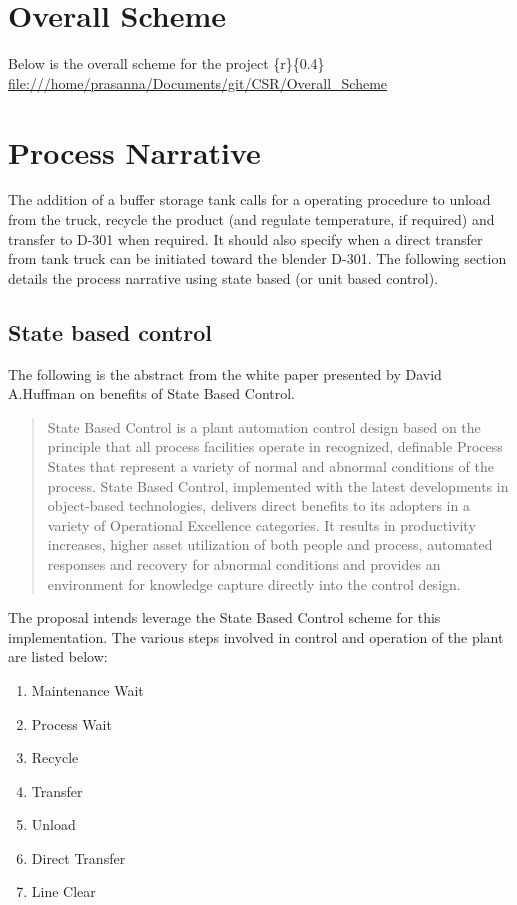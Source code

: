\documentclass[a4paper,oneside]{article}
\begin{document}
\section{Overall Scheme}
\label{sec:org01ee439}
Below is the overall scheme for the project
\{r\}\{0.4\textwidth\} \url{file:///home/prasanna/Documents/git/CSR/Overall\_Scheme}
\section{Process Narrative}
\label{sec:org4ba112a}
The addition of a buffer storage tank calls for a operating procedure
to unload from the truck, recycle the product (and regulate
temperature, if required) and transfer to D-301 when required. It
should also specify when a direct transfer from tank truck can be
initiated toward the blender D-301. The following section details the
process narrative using state based (or unit based control).
\subsection{State based control}
\label{sec:org6e6a2a7}
The following is the abstract from the white paper presented by David
A.Huffman on benefits of State Based Control.
\begin{quote}
State Based Control is a plant automation control design based on the
principle that all process facilities operate in recognized, definable
Process States that represent a variety of normal and abnormal
conditions of the process. State Based Control, implemented with the
latest developments in object-based technologies, delivers direct
benefits to its adopters in a variety of Operational Excellence
categories. It results in productivity increases, higher asset
utilization of both people and process, automated responses and
recovery for abnormal conditions and provides an environment for
knowledge capture directly into the control design.
\end{quote}
The proposal intends leverage the State Based Control scheme for this
implementation. The various steps involved in control and operation of
the plant are listed below: 
\begin{enumerate}
\item Maintenance Wait
\item Process Wait
\item Recycle
\item Transfer
\item Unload
\item Direct Transfer
\item Line Clear
\end{enumerate}
\end{document}
